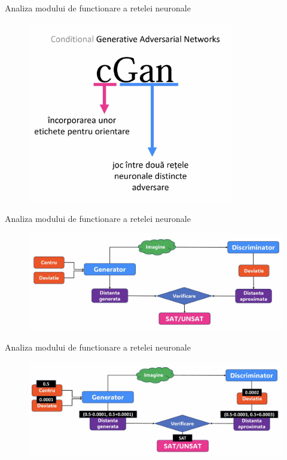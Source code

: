 \begin{frame}{Analiza modului de functionare a retelei neuronale}
    \begin{figure}[ht]
    \centering
    {\includegraphics[width=9cm]{images/introducere/Ale_3.jpeg}}
    \label{vnnlib}
    \end{figure}
\end{frame}

\begin{frame}{Analiza modului de functionare a retelei neuronale}
    \begin{figure}[ht]
    \centering
    {\includegraphics[width=12cm]{images/introducere/Ale_1.jpeg}}
    \label{vnnlib}
    \end{figure}
\end{frame}


\begin{frame}{Analiza modului de functionare a retelei neuronale}   
    \begin{figure}[ht]
    \centering
    {\includegraphics[width=12cm]{images/introducere/Ale_2.jpeg}}
    \label{vnnlib}
    \end{figure}
\end{frame}
